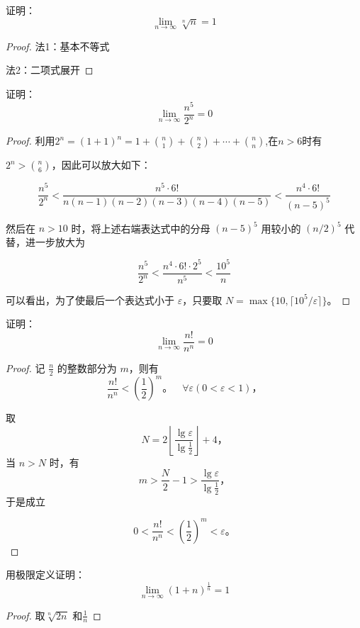 \documentclass[lang=cn,12pt]{elegantbook}
\begin{document}
\begin{example}
    证明：$$\lim_{n \to \infty}   \sqrt[n]{n} = 1$$
\end{example}
\begin{proof}
    法1：基本不等式
    
    法2：二项式展开
\end{proof}

\begin{example}
    证明：$$\lim_{n \to \infty} \frac{n^5}{2^n} = 0$$
\end{example}

\begin{proof}
    利用$2^n = (1 + 1)^n = 1 + \binom{n}{1} + \binom{n}{2} + \cdots + \binom{n}{n}$,在$n > 6$时有 \par
    \(2^n > \binom{n}{6}\)，因此可以放大如下：

\[
\frac{n^5}{2^n} < \frac{n^5 \cdot 6!}{n(n-1)(n-2)(n-3)(n-4)(n-5)} < \frac{n^4 \cdot 6!}{(n-5)^5}
\]

然后在 \( n > 10 \) 时，将上述右端表达式中的分母 \((n-5)^5\) 用较小的 \((n/2)^5\) 代替，进一步放大为

\[
\frac{n^5}{2^n} < \frac{n^4 \cdot 6! \cdot 2^5}{n^5} < \frac{10^5}{n}
\]

可以看出，为了使最后一个表达式小于 \(\varepsilon\)，只要取 \(N = \max\{10, \lceil 10^5/\varepsilon \rceil\}\)。
\end{proof}

\begin{example}
    证明：$$\lim_{n \to \infty} \frac{n!}{n^n} = 0$$
\end{example}
\begin{proof}
    记 \(\frac{n}{2}\) 的整数部分为 \(m\)，则有  
\[
\frac{n!}{n^n} < \left( \frac{1}{2} \right)^m 。\quad \forall \varepsilon (0 < \varepsilon < 1)，
\]

取  
\[
N = 2 \left\lfloor \frac{\lg \varepsilon}{\lg \frac{1}{2}} \right\rfloor + 4，
\]
当 \(n > N\) 时，有  
\[
m > \frac{N}{2} - 1 > \frac{\lg \varepsilon}{\lg \frac{1}{2}}，
\]
于是成立  

\[
0 < \frac{n!}{n^n} < \left( \frac{1}{2} \right)^m < \varepsilon 。
\]
\end{proof}


\begin{example}
    用极限定义证明：\[
    \lim_{n \to \infty} (1+n)^{\frac{1}{n}} = 1
\]
\end{example}
\begin{proof}
    取$\sqrt[n]{2n}$ 和$\frac{1}{n}$
\end{proof}
\end{document}
